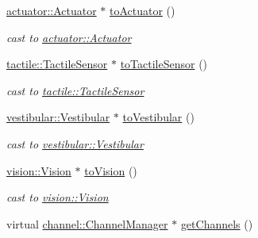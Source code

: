 \begin{DoxyCompactItemize}
\hyperlink{classdrobot_1_1device_1_1actuator_1_1Actuator}{actuator\-::\-Actuator} $\ast$ \hyperlink{classdrobot_1_1device_1_1Device_a4aa4ad98eb5ed0251fa48b6ebd5c96d6}{to\-Actuator} ()
\begin{DoxyCompactList}\small\item\em cast to \hyperlink{classdrobot_1_1device_1_1actuator_1_1Actuator}{actuator\-::\-Actuator} \end{DoxyCompactList}\item 
\hyperlink{classdrobot_1_1device_1_1tactile_1_1TactileSensor}{tactile\-::\-Tactile\-Sensor} $\ast$ \hyperlink{classdrobot_1_1device_1_1Device_a2f95e9596d7fa2dffcf2e398192d46c0}{to\-Tactile\-Sensor} ()
\begin{DoxyCompactList}\small\item\em cast to \hyperlink{classdrobot_1_1device_1_1tactile_1_1TactileSensor}{tactile\-::\-Tactile\-Sensor} \end{DoxyCompactList}\item 
\hyperlink{classdrobot_1_1device_1_1vestibular_1_1Vestibular}{vestibular\-::\-Vestibular} $\ast$ \hyperlink{classdrobot_1_1device_1_1Device_a3ad656dee133fa5df9eaa466b3530234}{to\-Vestibular} ()
\begin{DoxyCompactList}\small\item\em cast to \hyperlink{classdrobot_1_1device_1_1vestibular_1_1Vestibular}{vestibular\-::\-Vestibular} \end{DoxyCompactList}\item 
\hyperlink{classdrobot_1_1device_1_1vision_1_1Vision}{vision\-::\-Vision} $\ast$ \hyperlink{classdrobot_1_1device_1_1Device_a7041c41a60a8eccd694ff08c0a8f5827}{to\-Vision} ()
\begin{DoxyCompactList}\small\item\em cast to \hyperlink{classdrobot_1_1device_1_1vision_1_1Vision}{vision\-::\-Vision} \end{DoxyCompactList}\item 
virtual \hyperlink{classdrobot_1_1device_1_1channel_1_1ChannelManager}{channel\-::\-Channel\-Manager} $\ast$ \hyperlink{classdrobot_1_1device_1_1Device_a67e466715422618b28226a17f14c0170}{get\-Channels} ()
\end{DoxyCompactItemize}
